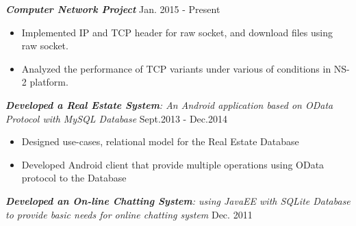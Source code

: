 \documentclass[margin, 10pt]{res}%
\begin{document}
\begin{resume}
{\sl \textbf{Computer Network Project }}\hfill Jan. 2015 - Present
\begin{itemize}
\item Implemented IP and TCP header for raw socket, and download files using raw socket.
\item Analyzed the performance of TCP variants under various of conditions in NS-2 platform.
\end{itemize}
{\sl \textbf{Developed a Real Estate System}: An Android application based on OData Protocol with MySQL Database} \hfill Sept.2013 - Dec.2014
\begin{itemize}
\item Designed use-cases, relational model for the Real Estate Database
\item Developed Android client that provide multiple operations using OData protocol to the Database
\end{itemize}


{\sl \textbf{Developed an On-line Chatting System}: using JavaEE with SQLite Database to provide basic needs for online chatting system} \hfill Dec. 2011\\


\end{resume}
\end{document}
